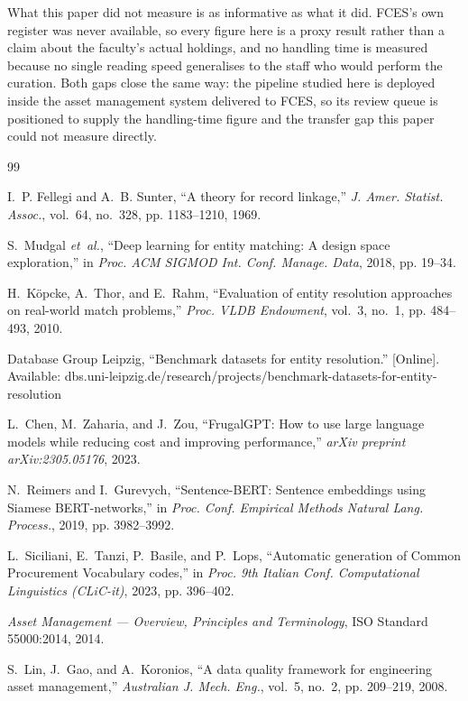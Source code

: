 \documentclass[conference]{IEEEtran}
\begin{document}
What this paper did not measure is as informative as what it did.
FCES's own register was never available, so every figure here is a
proxy result rather than a claim about the faculty's actual holdings,
and no handling time is measured because no single reading speed
generalises to the staff who would perform the curation. Both gaps
close the same way: the pipeline studied here is deployed inside the
asset management system delivered to FCES, so its review queue is
positioned to supply the handling-time figure and the transfer gap
this paper could not measure directly.

\begin{thebibliography}{99}

I.~P. Fellegi and A.~B. Sunter, ``A theory for record linkage,'' \emph{J. Amer.
  Statist. Assoc.}, vol.~64, no.~328, pp. 1183--1210, 1969.

S.~Mudgal \emph{et~al.}, ``Deep learning for entity matching: A design space
  exploration,'' in \emph{Proc. ACM SIGMOD Int. Conf. Manage. Data}, 2018, pp.
  19--34.

H.~K\"{o}pcke, A.~Thor, and E.~Rahm, ``Evaluation of entity resolution
  approaches on real-world match problems,'' \emph{Proc. VLDB Endowment},
  vol.~3, no.~1, pp. 484--493, 2010.

Database Group Leipzig, ``Benchmark datasets for entity resolution.''
  [Online]. Available: dbs.uni-leipzig.de/research/projects/benchmark-datasets-for-entity-resolution

L.~Chen, M.~Zaharia, and J.~Zou, ``FrugalGPT: How to use large language
  models while reducing cost and improving performance,'' \emph{arXiv
  preprint arXiv:2305.05176}, 2023.

N.~Reimers and I.~Gurevych, ``Sentence-BERT: Sentence embeddings using Siamese
  BERT-networks,'' in \emph{Proc. Conf. Empirical Methods Natural Lang.
  Process.}, 2019, pp. 3982--3992.

L.~Siciliani, E.~Tanzi, P.~Basile, and P.~Lops, ``Automatic generation of
  Common Procurement Vocabulary codes,'' in \emph{Proc. 9th Italian Conf.
  Computational Linguistics (CLiC-it)}, 2023, pp. 396--402.

\emph{Asset Management --- Overview, Principles and Terminology}, ISO Standard
  55000:2014, 2014.

S.~Lin, J.~Gao, and A.~Koronios, ``A data quality framework for engineering
  asset management,'' \emph{Australian J. Mech. Eng.}, vol.~5, no.~2, pp.
  209--219, 2008.


\end{thebibliography}
\end{document}
